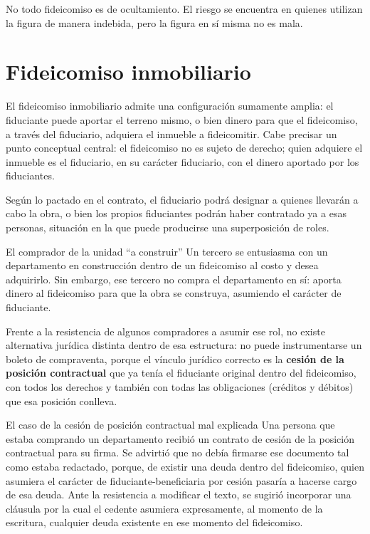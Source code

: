 \documentclass[12pt,oneside]{book}
\begin{document}
\begin{important}
No todo fideicomiso es de ocultamiento. El riesgo se encuentra en quienes utilizan la figura de manera indebida, pero la figura en sí misma no es mala.
\end{important}

\section{Fideicomiso inmobiliario}

El fideicomiso inmobiliario admite una configuración sumamente amplia: el fiduciante puede aportar el terreno mismo, o bien dinero para que el fideicomiso, a través del fiduciario, adquiera el inmueble a fideicomitir. Cabe precisar un punto conceptual central: el fideicomiso no es sujeto de derecho; quien adquiere el inmueble es el fiduciario, en su carácter fiduciario, con el dinero aportado por los fiduciantes.

Según lo pactado en el contrato, el fiduciario podrá designar a quienes llevarán a cabo la obra, o bien los propios fiduciantes podrán haber contratado ya a esas personas, situación en la que puede producirse una superposición de roles.

\begin{example}{El comprador de la unidad ``a construir''}
Un tercero se entusiasma con un departamento en construcción dentro de un fideicomiso al costo y desea adquirirlo. Sin embargo, ese tercero no compra el departamento en sí: aporta dinero al fideicomiso para que la obra se construya, asumiendo el carácter de fiduciante.

Frente a la resistencia de algunos compradores a asumir ese rol, no existe alternativa jurídica distinta dentro de esa estructura: no puede instrumentarse un boleto de compraventa, porque el vínculo jurídico correcto es la \textbf{cesión de la posición contractual} que ya tenía el fiduciante original dentro del fideicomiso, con todos los derechos y también con todas las obligaciones (créditos y débitos) que esa posición conlleva.
\end{example}

\begin{example}{El caso de la cesión de posición contractual mal explicada}
Una persona que estaba comprando un departamento recibió un contrato de cesión de la posición contractual para su firma. Se advirtió que no debía firmarse ese documento tal como estaba redactado, porque, de existir una deuda dentro del fideicomiso, quien asumiera el carácter de fiduciante-beneficiaria por cesión pasaría a hacerse cargo de esa deuda. Ante la resistencia a modificar el texto, se sugirió incorporar una cláusula por la cual el cedente asumiera expresamente, al momento de la escritura, cualquier deuda existente en ese momento del fideicomiso.
\end{example}
\end{document}
